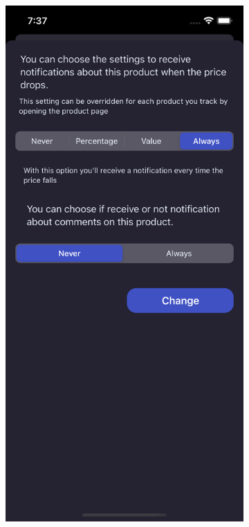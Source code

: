 \begin{figure}[h!]
        \centering
        \begin{subfigure}[b]{0.3\textwidth}
            \centering
            \includegraphics[width=\textwidth]{images/interfaces/always_never_notification_screen.png}

\end{subfigure}
\end{figure}
